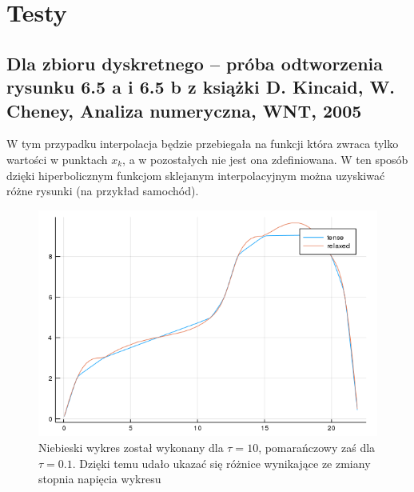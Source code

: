 \documentclass{article}
\begin{document}
\newpage

\section{Testy}
\subsection{Dla zbioru dyskretnego -- próba odtworzenia rysunku 6.5 a i 6.5 b z książki D. Kincaid, W. Cheney, Analiza numeryczna, WNT, 2005}
W tym przypadku interpolacja będzie przebiegała na funkcji która zwraca tylko wartości w punktach $x_{k}$, a w pozostałych nie jest ona zdefiniowana. W ten sposób dzięki hiperbolicznym funkcjom sklejanym interpolacyjnym można uzyskiwać różne rysunki (na przykład samochód).
\begin{figure}[ht]
  \begin{center}
  \includegraphics[width=15cm]{samochodzik}
  \end{center}
  \caption{Niebieski wykres został wykonany dla $\tau = 10$, pomarańczowy zaś dla $\tau = 0.1$. Dzięki temu udało ukazać się różnice wynikające ze zmiany stopnia napięcia wykresu}
  \label{fig:rysunek}
\end{figure}
\newpage
\end{document}
